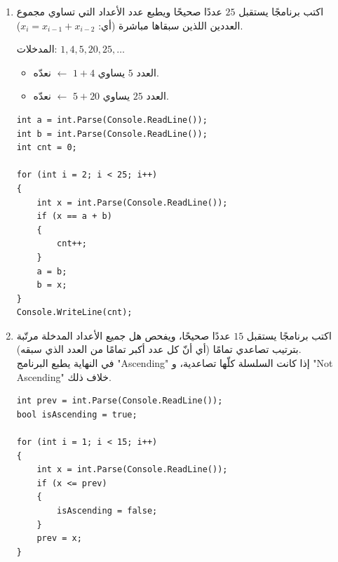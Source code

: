 \documentclass[14pt]{extarticle}
\begin{document}
\begin{enumerate}[itemsep=2em]
\begin{boxSolution}
\begin{english}
\begin{verbatim}
for (int i = 1; i < 20; i++)
{
    int x = int.Parse(Console.ReadLine());
    if ((prev > 0 && x < 0) || (prev < 0 && x > 0))
    {
        signChanges++;
    }
    prev = x;
}
Console.WriteLine(signChanges);
\end{verbatim}
\end{english}
\end{boxSolution}
\fi
\filbreak

\item اكتب برنامجًا يستقبل $25$ عددًا صحيحًا ويطبع عدد الأعداد التي تساوي مجموع العددين اللذين سبقاها مباشرة (أي: $x_i = x_{i-1} + x_{i-2}$).
\ifdetailed
\begin{boxExample}
المدخلات: $1, 4, 5, 20, 25, \ldots$
\begin{itemize}[nosep]
    \item العدد $5$ يساوي $1 + 4$ $\leftarrow$ نعدّه.
    \item العدد $25$ يساوي $5 + 20$ $\leftarrow$ نعدّه.
\end{itemize}
\end{boxExample}
\fi
\ifwithsols
\begin{boxSolution}
\begin{english}
\begin{verbatim}
int a = int.Parse(Console.ReadLine());
int b = int.Parse(Console.ReadLine());
int cnt = 0;

for (int i = 2; i < 25; i++)
{
    int x = int.Parse(Console.ReadLine());
    if (x == a + b)
    {
        cnt++;
    }
    a = b;
    b = x;
}
Console.WriteLine(cnt);
\end{verbatim}
\end{english}
\end{boxSolution}
\fi
\filbreak

\item اكتب برنامجًا يستقبل $15$ عددًا صحيحًا، ويفحص هل جميع الأعداد المدخلة مرتّبة بترتيب تصاعدي تمامًا (أي أنّ كل عدد أكبر تمامًا من العدد الذي سبقه). \\
في النهاية يطبع البرنامج \textenglish{"Ascending"} إذا كانت السلسلة كلّها تصاعدية، و \textenglish{"Not Ascending"} خلاف ذلك.
\ifwithsols
\begin{boxSolution}
\begin{english}
\begin{verbatim}
int prev = int.Parse(Console.ReadLine());
bool isAscending = true;

for (int i = 1; i < 15; i++)
{
    int x = int.Parse(Console.ReadLine());
    if (x <= prev)
    {
        isAscending = false;
    }
    prev = x;
}


\end{verbatim}
\end{english}
\end{boxSolution}
\end{enumerate}
\end{document}
